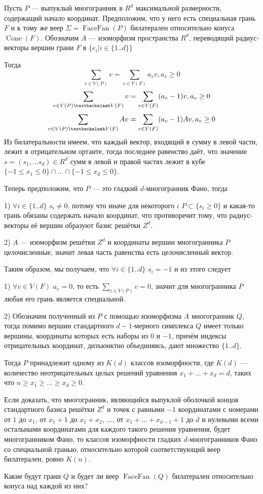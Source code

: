 \documentclass[12pt,notitlepage]{article}
\DeclareMathOperator{\FF}{FaceFan}
\DeclareMathOperator{\Cone}{Cone}
\begin{document}
	Пусть $P$ --- выпуклый многогранник в $R^d$ максимальной размерности, содержащий начало координат. Предположим, что у него есть специальная грань $F$ и к тому же веер $\Sigma=\FF(P)$ билатерален относительно конуса $\Cone(F)$. Обозначим $A$ --- изоморфизм пространства $R^d$, переводящий радиус-векторы вершин грани $F$ в $\{e_i | i \in \{1 .. d\}\}$
	
	Тогда
		\[
		\sum_{v \in V(P)} v = \sum_{v \in V(F)} a_v v, a_v \geq 0
		\]
		\[
		\sum_{v \in V(P)\textbackslash V(F)} v = \sum_{v \in V(F)} (a_v - 1) v, a_v \geq 0
		\]
		\[
		\sum_{v \in V(P)\textbackslash V(F)} Av = \sum_{v \in V(F)} (a_v - 1) Av, a_v \geq 0
		\]
	Из билатеральности имеем, что каждый вектор, входящий в сумму в левой части, лежит в отрицательном ортанте, тогда последнее равенство даёт, что значение $s = (s_1, ... s_d) \in R^d$ сумм в левой и правой частях лежит в кубе $\{-1 \leq x_1 \leq 0\} \cap ... \cap \{ -1 \leq x_d \leq 0\}$.
	
	Теперь предположим, что $P$ --- это гладкий $d$-многогранник Фано, тогда
	
	1) $\forall i \in \{1 .. d\}$ $s_i \neq 0$, потому что иначе для некоторого $i$ $P \subset \{s_i \geq 0\}$ и какая-то грань обязаны содержать начало координат, что противоречит тому, что радиус-векторы её вершин образуют базис решётки $Z^d$.
	
	2) $A$ --- изоморфизм решётки $Z^d$ и координаты вершин многогранника $P$ целочисленные, значит левая часть равенства есть целочисленный вектор.
	
	Таким образом, мы получаем, что $\forall i \in \{1 .. d\}$ $s_i = -1$ и из этого следует
	
	1) $\forall v \in V(F)$ $a_v = 0$, то есть $\sum_{v \in V(P)} v=0$, значит для многогранника $P$ любая его грань является специальной.
	
	2) Обозначим полученный из $P$ с помощью изоморфизма $A$ многогранник $Q$, тогда помимо вершин стандартного $d-1$-мерного симплекса $Q$ имеет только вершины, координаты которых есть наборы из $0$ и $-1$, причём индексы отрицательных координат, дизъюнктно объединяясь, дают множество $\{1 .. d\}$.
	
	Тогда $P$ принадлежит одному из $K(d)$ классов изоморфности, где $K(d)$ --- количество неотрицательных целых решений уравнения $x_1 + ... + x_d = d$, таких что $n \geq x_1 \geq ... \geq x_d \geq 0$.
	
	Если доказать, что многогранник, являющийся выпуклой оболочкой концов стандартного базиса решётки $Z^d$ и точек с равными $-1$ координатами с номерами от $1$ до $x_1$, от $x_1 + 1$ до $x_1 + x_2$, ..., от $x_1 + ... + x_{d-1} + 1$ до $d$ и нулевыми всеми остальными координатами для каждого такого решения уравнения, будет многогранником Фано, то классов изоморфности гладких $d$-многогранников Фано со специальной гранью, относительно которой соответствующий веер билатерален, ровно $K(n)$.
	
	Какие будут грани $Q$ и будет ли веер $\FF(Q)$ билатерален относительно конуса над каждой из них?
	
\end{document}

